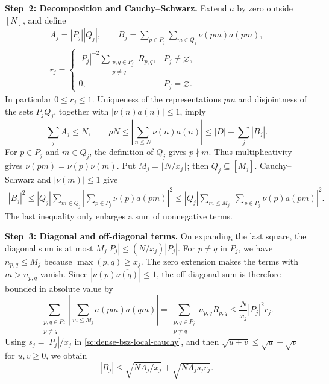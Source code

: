 \documentclass[twoside]{aomart}
\makeatletter
\theoremstyle{paperplain}
\theoremstyle{paperdefinition}
\renewenvironment{proof}[1][\proofname]{\par\pushQED{\qed}%
  \normalfont\topsep6\p@\@plus3\p@\relax\trivlist
  \item[\hskip\labelsep\itshape #1\@addpunct{.}]\ignorespaces
}{\popQED\endtrivlist\@endpefalse}
\numberwithin{equation}{section}
\makeatother
\begin{document}
\begin{proof}
\par
\medskip
\noindent\textbf{Step~2: Decomposition and Cauchy--Schwarz.}
Extend $a$ by zero outside $[N]$, and define
\begin{equation*}
 \begin{gathered}
 A_j=|P_j||Q_j|,\qquad
 B_j=\sum_{p\in P_j}\sum_{m\in Q_j}\nu(pm)a(pm),\\
 r_j=\begin{cases}
 |P_j|^{-2}\displaystyle\sum_{\substack{p,q\in P_j\\p\ne q}}R_{p,q},
       &P_j\ne\varnothing,\\
 0,    &P_j=\varnothing.
 \end{cases}
 \end{gathered}
 \end{equation*}
In particular $0\le r_j\le1$.
Uniqueness of the representations $pm$ and disjointness of the
sets $P_jQ_j$, together with $|\nu(n)a(n)|\le1$, imply
\begin{equation}
 \sum_jA_j\le N,
 \qquad
 \rho N\le\left|\sum_{n\le N}\nu(n)a(n)\right|
          \le |D|+\sum_j|B_j|.
 \label{sc:dense-bsz-decomposition-sum}
\end{equation}
For $p\in P_j$ and $m\in Q_j$, the definition of $Q_j$ gives
$p\nmid m$. Thus multiplicativity gives $\nu(pm)=\nu(p)\nu(m)$.
Put $M_j=\lfloor N/x_j\rfloor$; then $Q_j\subseteq[M_j]$.
Cauchy--Schwarz and $|\nu(m)|\le1$ give
\begin{equation}
 \begin{aligned}
 |B_j|^2
 \le |Q_j|\sum_{m\in Q_j}
       \left|\sum_{p\in P_j}\nu(p)a(pm)\right|^2
 \le |Q_j|\sum_{m\le M_j}
       \left|\sum_{p\in P_j}\nu(p)a(pm)\right|^2.
 \end{aligned}
 \label{sc:dense-bsz-local-cauchy}
\end{equation}
The last inequality only enlarges a sum of nonnegative terms.

\par
\medskip
\noindent\textbf{Step~3: Diagonal and off-diagonal terms.}
On expanding the last square, the diagonal sum is at most
$M_j|P_j|\le (N/x_j)|P_j|$.
For $p\ne q$ in $P_j$, we have $n_{p,q}\le M_j$ because
$\max(p,q)\ge x_j$. The zero extension makes the terms with
$m>n_{p,q}$ vanish. Since
$|\nu(p)\overline{\nu(q)}|\le1$, the off-diagonal sum is therefore
bounded in absolute value by
\begin{equation*}
 \sum_{\substack{p,q\in P_j\\p\ne q}}
 \left|\sum_{m\le M_j}a(pm)\overline{a(qm)}\right|
 =\sum_{\substack{p,q\in P_j\\p\ne q}}n_{p,q}R_{p,q}
 \le\frac{N}{x_j}|P_j|^2r_j.
 \end{equation*}
Using $s_j=|P_j|/x_j$ in
\eqref{sc:dense-bsz-local-cauchy}, and then
$\sqrt{u+v}\le\sqrt u+\sqrt v$ for $u,v\ge0$, we obtain
\begin{equation}
 |B_j|\le\sqrt{NA_j/x_j}+\sqrt{NA_js_jr_j}.
 \label{sc:dense-bsz-local-bound}
\end{equation}


\end{proof}
\end{document}

